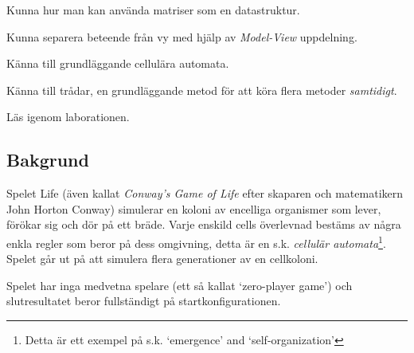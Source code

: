 

\Lab{\LabWeekTWELVE}

\begin{Goals}
    \item Kunna hur man kan använda matriser som en datastruktur.
    \item Kunna separera beteende från vy med hjälp av \emph{Model-View} uppdelning.
    \item Känna till grundläggande cellulära automata. %
    \item Känna till trådar, en grundläggande metod för att köra flera metoder \emph{samtidigt}.
\end{Goals}

\begin{Preparations}
    \item Läs igenom laborationen.
\end{Preparations}

\subsection{Bakgrund}

Spelet Life (även kallat \emph{Conway's Game of Life} efter skaparen och matematikern John Horton Conway) simulerar en koloni av encelliga organismer som lever, förökar sig och dör på ett bräde. Varje enskild cells överlevnad bestäms av några enkla regler som beror på dess omgivning, detta är en s.k. \emph{cellulär automata}\footnote{Detta är ett exempel på s.k. `emergence' and `self-organization'}.  Spelet går ut på att simulera flera generationer av en cellkoloni.

Spelet har inga medvetna spelare (ett så kallat `zero-player game') och slutresultatet beror fullständigt på startkonfigurationen.


